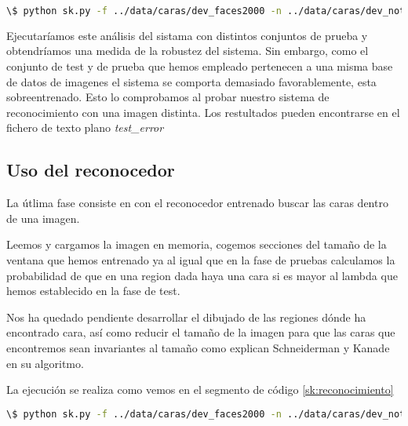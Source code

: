 \begin{lstlisting}[language=bash,label=sk:test,caption=Ejecución en modo pruebas]
\$ python sk.py -f ../data/caras/dev_faces2000 -n ../data/caras/dev_notFaces2000 -l 0.090909091113 -d -ft ../data/caras/faces_test600 -nt ../data/caras/notfaces_test600 -t-f
\end{lstlisting}

Ejecutaríamos este análisis del sistama con distintos conjuntos de prueba y obtendríamos una medida de la robustez del sistema. Sin embargo, como el conjunto de test y de prueba que hemos empleado pertenecen a una misma base de datos de imagenes el sistema se comporta demasiado favorablemente, esta sobreentrenado. Esto lo comprobamos al probar nuestro sistema de reconocimiento con una imagen distinta. Los restultados pueden encontrarse en el fichero de texto plano \textit{test\_error}

\subsection{Uso del reconocedor}
La útlima fase consiste en con el reconocedor entrenado buscar las caras dentro de una imagen.\par
Leemos y cargamos la imagen en memoria, cogemos secciones del tamaño de la ventana que hemos entrenado ya al igual que en la fase de pruebas calculamos la probabilidad de que en una region dada haya una cara si es mayor al lambda que hemos establecido en la fase de test. \par

Nos ha quedado pendiente desarrollar el dibujado de las regiones dónde ha encontrado cara, así como reducir el tamaño de la imagen para que las caras que encontremos sean invariantes al tamaño como explican Schneiderman y Kanade en su algoritmo.\par

La ejecución  se realiza como vemos en el segmento de código \ref{sk:reconocimiento}
\begin{lstlisting}[language=bash,label=sk:reconocimiento,caption=Ejecución en modo reconocedor]
\$ python sk.py -f ../data/caras/dev_faces2000 -n ../data/caras/dev_notFaces2000 -l 0.090909091113 -t -i ../data/caras/jr.png
\end{lstlisting}

